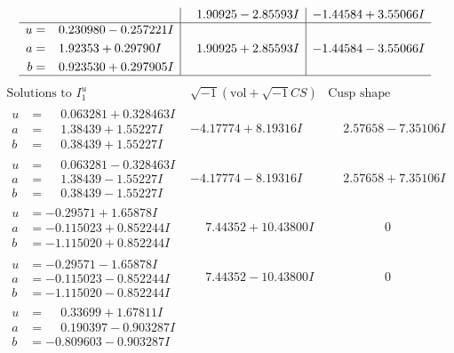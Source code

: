 \documentclass[1p]{elsarticle_modified}
\theoremstyle{definition}
\newcommand{\I}{\sqrt{-1}}
\begin{document}
$$\begin{array}{c|c|c}
 & \phantom{-}1.90925 - 2.85593 I & -1.44584 + 3.55066 I \\ \hline\begin{aligned}
u &= \phantom{-}0.230980 - 0.257221 I \\
a &= \phantom{-}1.92353 + 0.29790 I \\
b &= \phantom{-}0.923530 + 0.297905 I\end{aligned}
 & \phantom{-}1.90925 + 2.85593 I & -1.44584 - 3.55066 I\\
 \hline 
 \end{array}$$\newpage$$\begin{array}{c|c|c}  
\text{Solutions to }I^u_{1}& \I (\text{vol} + \sqrt{-1}CS) & \text{Cusp shape}\\
 \hline 
\begin{aligned}
u &= \phantom{-}0.063281 + 0.328463 I \\
a &= \phantom{-}1.38439 + 1.55227 I \\
b &= \phantom{-}0.38439 + 1.55227 I\end{aligned}
 & -4.17774 + 8.19316 I & \phantom{-}2.57658 - 7.35106 I \\ \hline\begin{aligned}
u &= \phantom{-}0.063281 - 0.328463 I \\
a &= \phantom{-}1.38439 - 1.55227 I \\
b &= \phantom{-}0.38439 - 1.55227 I\end{aligned}
 & -4.17774 - 8.19316 I & \phantom{-}2.57658 + 7.35106 I \\ \hline\begin{aligned}
u &= -0.29571 + 1.65878 I \\
a &= -0.115023 + 0.852244 I \\
b &= -1.115020 + 0.852244 I\end{aligned}
 & \phantom{-}7.44352 + 10.43800 I & \phantom{-0.000000 } 0 \\ \hline\begin{aligned}
u &= -0.29571 - 1.65878 I \\
a &= -0.115023 - 0.852244 I \\
b &= -1.115020 - 0.852244 I\end{aligned}
 & \phantom{-}7.44352 - 10.43800 I & \phantom{-0.000000 } 0 \\ \hline\begin{aligned}
u &= \phantom{-}0.33699 + 1.67811 I \\
a &= \phantom{-}0.190397 - 0.903287 I \\
b &= -0.809603 - 0.903287 I\end{aligned}

\end{array}$$
\end{document}
